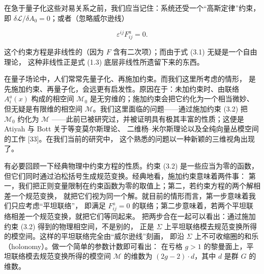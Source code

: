 \documentclass[11pt,a4paper]{article}
\begin{document}
在急于量子化这些对易关系之前，我们应当记住：系统还受一个“高斯定律”约束，
即 $\delta\mathcal{L}/\delta A_0=0$；或者（忽略威尔逊线）

\begin{equation}
    \varepsilon^{ij}F_{ij}^a = 0 .
    \tag{3.3}
\end{equation}


这个约束方程是非线性的（因为 $F$ 含有二次项）；而由于式 (3.1) 无疑是一个自由理论，
这种非线性正是式 (1.3) 底层非线性所遗留下来的东西。

在量子场论中，人们常常先量子化、再施加约束。而我们这里所考虑的情形，
是先施加约束、再量子化，会远更有启发性。原因在于：未加约束时、由联络 $A_i^a(x)$ 构成的相空间
$\mathcal{M}_0$ 是无穷维的；施加约束会把它约化为一个相当微妙、但无疑是有限维的相空间
$\mathcal{M}$。我们这里面临的问题——通过施加约束 (3.2) 把 $\mathcal{M}_0$ 约化为 $\mathcal{M}$
——此前已被研究过，并被证明具有极其丰富的性质；这便是 Atiyah 与 Bott 关于等变莫尔斯理论、
二维杨–米尔斯理论以及全纯向量丛模空间的工作 [33]。在我们当前的研究中，
这个熟悉的问题以一种新颖的三维视角出现了。


有必要回顾一下经典物理中约束方程的性质。约束 (3.2) 是一些应当为零的函数，
但它们同时通过泊松括号生成规范变换。经典地看，施加约束意味着两件事：
第一，我们把正则变量限制在约束函数为零的取值上；第二，若约束方程的两个解相差一个规范变换，
就把它们视为同一个解。就目前的情形而言，第一步意味着我们只应考虑“平坦联络”，
即满足 $F_{ij}^a=0$ 的联络；第二步意味着，若两个平坦联络相差一个规范变换，就把它们等同起来。
把两步合在一起可以看出：通过施加约束 (3.2) 得到的物理相空间，不是别的，
正是 $\Sigma$ 上平坦联络模去规范变换所得的模空间。这样的平坦联络完全由“威尔逊线”刻画，
即沿 $\Sigma$ 上不可收缩圈的和乐（holonomy）。做一个简单的参数计数即可看出：
在亏格 $g>1$ 的黎曼面上，平坦联络模去规范变换所得的模空间 $\mathcal{M}$ 的维数为
$(2g-2)\cdot d$，其中 $d$ 是群 $G$ 的维数。
\end{document}
